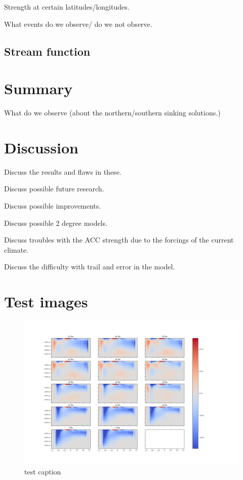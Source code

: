 \documentclass[a4paper]{article}
\begin{document}
\begin{multicols}{2}
Strength at certain latitudes/longitudes.

What events do we observe/ do we not observe.

\subsection{Stream function}



\section{Summary}

What do we observe (about the northern/southern sinking solutions.)


\section{Discussion}
Discuss the results and flaws in these.

Discuss possible future research.

Discuss possible improvements.

Discuss possible 2 degree models.

Discuss troubles with the ACC strength due to the forcings of the current climate.

Discuss the difficulty with trail and error in the model.



\section{Test images}
\begin{figure}[H]
	\includegraphics[width=\linewidth]{overturning_overview.png}
	\caption{test caption}
	\label{fig:example1}
\end{figure}
\end{multicols}
\end{document}
